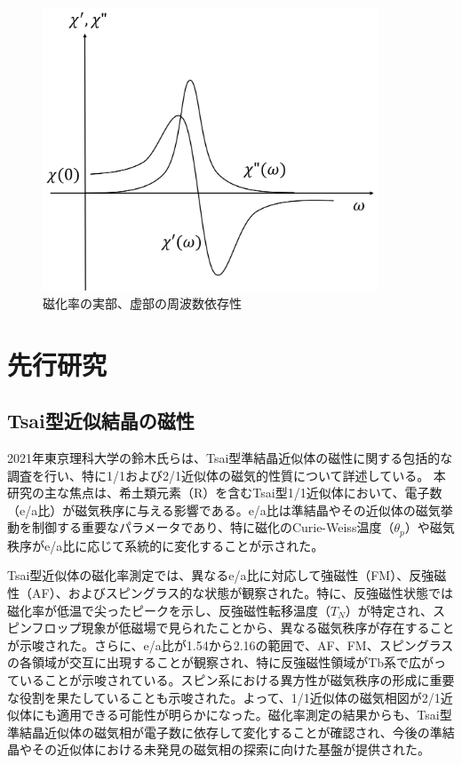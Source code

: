 \documentclass[11pt,a4j]{jreport}
\begin{document}
\begin{figure}[htbp]
  \centering
  \vspace{10mm}
  \includegraphics[width=100mm]{./figure/outou.png}
  \caption{磁化率の実部、虚部の周波数依存性}
  \label{outou}
\end{figure}



\chapter{先行研究}

\section{Tsai型近似結晶の磁性}
2021年東京理科大学の鈴木氏らは、Tsai型準結晶近似体の磁性に関する包括的な調査を行い、特に1/1および2/1近似体の磁気的性質について詳述している。
本研究の主な焦点は、希土類元素（R）を含むTsai型1/1近似体において、電子数（e/a比）が磁気秩序に与える影響である。e/a比は準結晶やその近似体の磁気挙動を制御する重要なパラメータであり、特に磁化のCurie-Weiss温度（$\theta_p$）や磁気秩序がe/a比に応じて系統的に変化することが示された。\par
Tsai型近似体の磁化率測定では、異なるe/a比に対応して強磁性（FM）、反強磁性（AF）、およびスピングラス的な状態が観察された。特に、反強磁性状態では磁化率が低温で尖ったピークを示し、反強磁性転移温度（$T_N$）が特定され、スピンフロップ現象が低磁場で見られたことから、異なる磁気秩序が存在することが示唆された。さらに、e/a比が1.54から2.16の範囲で、AF、FM、スピングラスの各領域が交互に出現することが観察され、特に反強磁性領域がTb系で広がっていることが示唆されている。スピン系における異方性が磁気秩序の形成に重要な役割を果たしていることも示唆された。よって、1/1近似体の磁気相図が2/1近似体にも適用できる可能性が明らかになった。磁化率測定の結果からも、Tsai型準結晶近似体の磁気相が電子数に依存して変化することが確認され、今後の準結晶やその近似体における未発見の磁気相の探索に向けた基盤が提供された。
\end{document}
